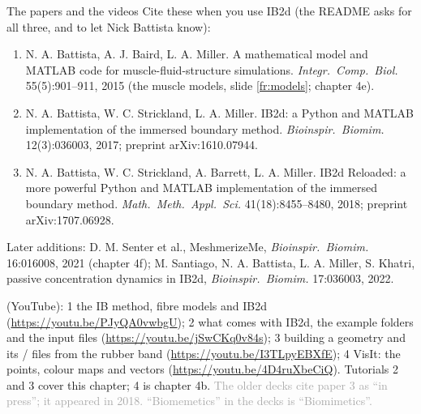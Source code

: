 \documentclass[aspectratio=169,11pt]{beamer}
\newcommand{\sourcecredit}[1]{\vfill\hfill{\tiny\textcolor{DarkGray}{#1}}}
\begin{document}
\begin{frame}{The papers and the videos}
\label{fr:papers}
\footnotesize
Cite these when you use IB2d (the README asks for all three, and to let Nick Battista know):
\begin{enumerate}
  \item N. A. Battista, A. J. Baird, L. A. Miller. A mathematical model and MATLAB code for muscle-fluid-structure simulations. \emph{Integr.\ Comp.\ Biol.} 55(5):901--911, 2015 (the muscle models, slide \ref{fr:models}; chapter 4e).
  \item N. A. Battista, W. C. Strickland, L. A. Miller. IB2d: a Python and MATLAB implementation of the immersed boundary method. \emph{Bioinspir.\ Biomim.} 12(3):036003, 2017; preprint arXiv:1610.07944.
  \item N. A. Battista, W. C. Strickland, A. Barrett, L. A. Miller. IB2d Reloaded: a more powerful Python and MATLAB implementation of the immersed boundary method. \emph{Math.\ Meth.\ Appl.\ Sci.} 41(18):8455--8480, 2018; preprint arXiv:1707.06928.
\end{enumerate}
Later additions: D. M. Senter et al., MeshmerizeMe, \emph{Bioinspir.\ Biomim.} 16:016008, 2021 (chapter 4f); M. Santiago, N. A. Battista, L. A. Miller, S. Khatri, passive concentration dynamics in IB2d, \emph{Bioinspir.\ Biomim.} 17:036003, 2022.

\vspace{1mm}
 (YouTube): 1 the IB method, fibre models and IB2d (\url{https://youtu.be/PJyQA0vwbgU}); 2 what comes with IB2d, the example folders and the input files (\url{https://youtu.be/jSwCKq0v84s}); 3 building a geometry and its / files from the rubber band (\url{https://youtu.be/I3TLpyEBXfE}); 4 VisIt: the points, colour maps and vectors (\url{https://youtu.be/4D4ruXbeCiQ}). Tutorials 2 and 3 cover this chapter; 4 is chapter 4b.
\sourcecredit{The older decks cite paper 3 as ``in press''; it appeared in 2018. ``Biomemetics'' in the decks is ``Biomimetics''.}
\end{frame}
\end{document}
